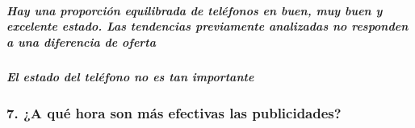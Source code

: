 \documentclass[11pt]{article}
\begin{document}
    \hypertarget{hay-una-proporciuxf3n-equilibrada-de-teluxe9fonos-en-buen-muy-buen-y-excelente-estado.-las-tendencias-previamente-analizadas-no-responden-a-una-diferencia-de-oferta}{%
\subparagraph{Hay una proporción equilibrada de teléfonos en buen, muy
buen y excelente estado. Las tendencias previamente analizadas no
responden a una diferencia de
oferta}\label{hay-una-proporciuxf3n-equilibrada-de-teluxe9fonos-en-buen-muy-buen-y-excelente-estado.-las-tendencias-previamente-analizadas-no-responden-a-una-diferencia-de-oferta}}

    \hypertarget{el-estado-del-teluxe9fono-no-es-tan-importante}{%
\subparagraph{El estado del teléfono no es tan
importante}\label{el-estado-del-teluxe9fono-no-es-tan-importante}}

    \hypertarget{a-quuxe9-hora-son-muxe1s-efectivas-las-publicidades}{%
\subsubsection{7. ¿A qué hora son más efectivas las
publicidades?}\label{a-quuxe9-hora-son-muxe1s-efectivas-las-publicidades}}
\end{document}
